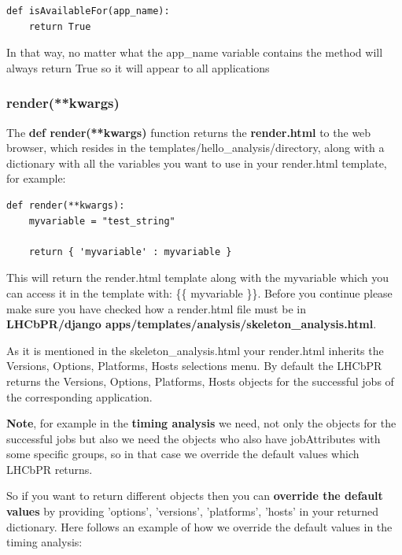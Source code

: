 \documentclass{lhcbnote}
\begin{document}
\begin{verbatim}
def isAvailableFor(app_name):
    return True
\end{verbatim}

In that way, no matter what the app\_name variable contains the method will always return True so it will appear to all applications

\subsubsection{render(**kwargs)}

The {\bf def render(**kwargs) } function returns the {\bf render.html} to the web browser, which resides in the templates/hello\_analysis/directory,
along with a dictionary with all the variables you want to use in your render.html template, 
for example:

\vspace{2 mm}

\begin{verbatim}
def render(**kwargs):
    myvariable = "test_string"

    return { 'myvariable' : myvariable }
\end{verbatim}

\vspace{2 mm}

This will return the render.html template along with the myvariable which you can access it in the template with: \{\{ myvariable \}\}. 
Before you continue please make sure you have checked how a render.html file must be in {\bf LHCbPR/django apps/templates/analysis/skeleton\_analysis.html}.

As it is mentioned in the skeleton\_analysis.html your render.html inherits the Versions, Options, Platforms, Hosts selections menu.
By default the LHCbPR returns the Versions, Options, Platforms, Hosts objects for the successful jobs of the corresponding application.

\vspace{2 mm}

{\bf Note}, for example in the {\bf timing analysis} we need, not only the objects for the successful jobs but also we need the objects who also have jobAttributes with some specific groups, so in that
case we override the default values which LHCbPR returns.

So if you want to return different objects then you can {\bf override the default values} by providing 'options', 'versions', 'platforms', 'hosts' in your returned dictionary. Here follows an example of how we override the default values in the timing analysis:
\end{document}
